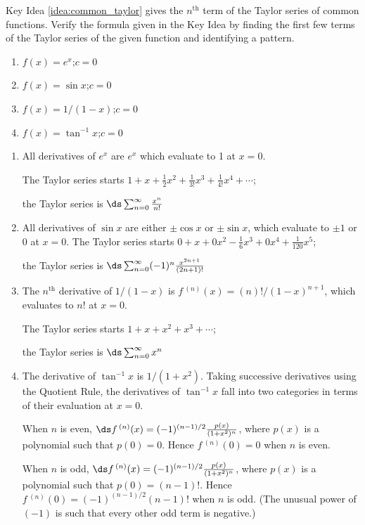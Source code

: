 \begin{enumialphparenastyle}

\begin{ex}
Key Idea \ref{idea:common_taylor} gives the $n^\text{th}$ term of the Taylor series of common functions. Verify the formula given in the Key Idea by finding the first few terms of the Taylor series of the given function and identifying a pattern.
\begin{enumerate}
\item {$f(x) = e^x$;\quad $c=0$
}
\item {$f(x) = \sin x$;\quad $c=0$
}
\item {$f(x) = 1/(1-x)$;\quad $c=0$
}
\item {$f(x) = \tan^{-1}x$;\quad $c=0$
}
\end{enumerate}

\begin{sol}
\begin{enumerate}
\item 
{All derivatives of $e^x$ are $e^x$ which evaluate to 1 at $x=0$. 

The Taylor series starts $1+x+\frac12x^2+\frac{1}{3!}x^3+\frac{1}{4!}x^4+\cdots$; 

the Taylor series is $\ds \sum_{n=0}^\infty \frac{x^n}{n!}$
}
\item 
{All derivatives of $\sin x$ are either $\pm\cos x$ or $\pm \sin x$, which evaluate to $\pm 1$ or $0$ at $x=0$. The Taylor series starts $0+x+0x^2-\frac16x^3+0x^4+\frac1{120}x^5$; 

the Taylor series is $\ds \sum_{n=0}^\infty (-1)^n\frac{x^{2n+1}}{(2n+1)!}$
}
\item 
{The $n^\text{th}$ derivative of $1/(1-x)$ is $f\,^{(n)}(x) = (n)!/(1-x)^{n+1}$, which evaluates to $n!$ at $x=0$. 

The Taylor series starts $1+x+x^2+x^3+\cdots$; 

the Taylor series is $\ds \sum_{n=0}^\infty x^n$
}
\item 
{The derivative of $\tan^{-1}x$ is $1/(1+x^2)$. Taking successive derivatives using the Quotient Rule, the derivatives of $\tan^{-1}x$ fall into two categories in terms of their evaluation at $x=0$. 

When $n$ is even, $\ds f\,^{(n)}(x) = (-1)^{(n-1)/2}\frac{p(x)}{(1+x^2)^n}$, where $p(x)$ is a polynomial such that $p(0) = 0$. Hence $f\,^{(n)}(0) = 0$ when $n$ is even.

When $n$ is odd, $\ds f\,^{(n)}(x) = (-1)^{(n-1)/2}\frac{p(x)}{(1+x^2)^n}$, where $p(x)$ is a polynomial such that $p(0) = (n-1)!$. Hence $f\,^{(n)}(0) = (-1)^{(n-1)/2}(n-1)!$ when $n$ is odd. (The unusual power of $(-1)$ is such that every other odd term is negative.)
 
}
\end{enumerate}
\end{sol}
\end{ex}
\end{enumialphparenastyle}
